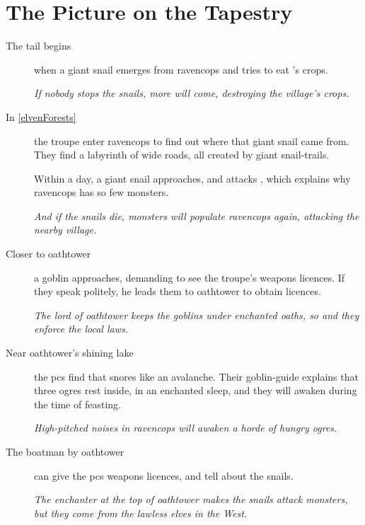 \enchantedMap

\section*{The Picture on the Tapestry}

\begin{multicols}{2}

\begin{description}
  \item[The tail begins]
  when a giant snail emerges from \gls{ravencops} and tries to eat 's crops.

  \textit{If nobody stops the snails, more will come, destroying the \gls{village}'s crops.}

  \item[In \autoref{elvenForests}]
  the troupe enter \gls{ravencops} to find out where that giant snail came from.
  They find a labyrinth of wide roads, all created by giant snail-trails.

  Within a day, a giant snail approaches, and attacks , which explains why \gls{ravencops} has so few monsters.

  \textit{And if the snails die, \glspl{monster} will populate \gls{ravencops} again, attacking the nearby \gls{village}.}

  \item[Closer to \gls{oathtower}]
  a goblin approaches, demanding to see the troupe's weapons licences.
  If they speak politely, he leads them to \gls{oathtower} to obtain licences.

  \textit{The lord of \gls{oathtower} keeps the goblins under enchanted oaths, so and they enforce the local laws.}

  \item[Near \gls{oathtower}'s shining lake]
  the \glspl{pc} find  that snores like an avalanche.
  Their goblin-guide explains that three \glspl{ogre} rest inside, in an enchanted sleep, and they will awaken during the time of feasting.

  \textit{High-pitched noises in \gls{ravencops} will awaken a horde of hungry \glspl{ogre}.}

  \item[The boatman by \gls{oathtower}]
  can give the \glspl{pc} weapons licences, and tell about the snails.

  \textit{The enchanter at the top of \gls{oathtower} makes the snails attack \glspl{monster}, but they come from the lawless elves in the West.}


\end{description}
\end{multicols}
